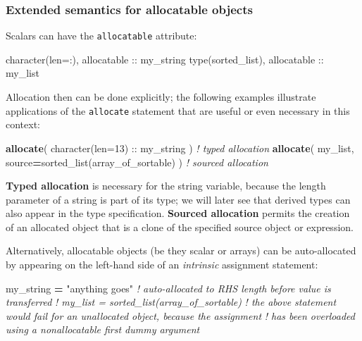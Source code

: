 \documentclass[
  paper=a4,
  ,captions=tableheading
]{scrartcl}
\newenvironment{Shaded}{\begin{snugshade}}{\end{snugshade}}
\newcommand{\CommentTok}[1]{\textcolor[rgb]{0.56,0.35,0.01}{\textit{#1}}}
\newcommand{\DataTypeTok}[1]{\textcolor[rgb]{0.13,0.29,0.53}{#1}}
\newcommand{\KeywordTok}[1]{\textcolor[rgb]{0.13,0.29,0.53}{\textbf{#1}}}
\newcommand{\NormalTok}[1]{#1}
\newcommand{\StringTok}[1]{\textcolor[rgb]{0.31,0.60,0.02}{#1}}
\begin{document}
\subsubsection{Extended semantics for allocatable
objects}\label{extended-semantics-for-allocatable-objects}

Scalars can have the \texttt{allocatable} attribute:

\begin{Shaded}
\begin{Highlighting}[]
\DataTypeTok{character(len=:)}\NormalTok{, }\DataTypeTok{allocatable} \DataTypeTok{::}\NormalTok{ my\_string}
\DataTypeTok{type(sorted\_list)}\NormalTok{, }\DataTypeTok{allocatable} \DataTypeTok{::}\NormalTok{ my\_list}
\end{Highlighting}
\end{Shaded}

Allocation then can be done explicitly; the following examples
illustrate applications of the \texttt{allocate} statement that are
useful or even necessary in this context:

\begin{Shaded}
\begin{Highlighting}[]
\KeywordTok{allocate}\NormalTok{( }\DataTypeTok{character(len=13)} \DataTypeTok{::}\NormalTok{ my\_string )                  }\CommentTok{! typed allocation}
\KeywordTok{allocate}\NormalTok{( my\_list, source}\KeywordTok{=}\NormalTok{sorted\_list(array\_of\_sortable) )  }\CommentTok{! sourced allocation}
\end{Highlighting}
\end{Shaded}

\textbf{Typed allocation} is necessary for the string variable, because
the length parameter of a string is part of its type; we will later see
that derived types can also appear in the type specification.
\textbf{Sourced allocation} permits the creation of an allocated object
that is a clone of the specified source object or expression.

Alternatively, allocatable objects (be they scalar or arrays) can be
auto-allocated by appearing on the left-hand side of an \emph{intrinsic}
assignment statement:

\begin{Shaded}
\begin{Highlighting}[]
\NormalTok{my\_string }\KeywordTok{=} \StringTok{"anything goes"}  \CommentTok{! auto{-}allocated to RHS length before value is transferred}
\CommentTok{! my\_list = sorted\_list(array\_of\_sortable)}
\CommentTok{! the above statement would fail for an unallocated object, because the assignment}
\CommentTok{! has been overloaded using a nonallocatable first dummy argument}
\end{Highlighting}
\end{Shaded}
\end{document}
